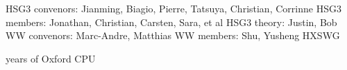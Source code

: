 
HSG3 convenors: Jianming, Biagio, Pierre, Tatsuya, Christian, Corrinne
HSG3 members: Jonathan, Christian, Carsten, Sara, et al
HSG3 theory: Justin, Bob
WW convenors: Marc-Andre, Matthias
WW members: Shu, Yusheng
HXSWG

years of Oxford CPU
